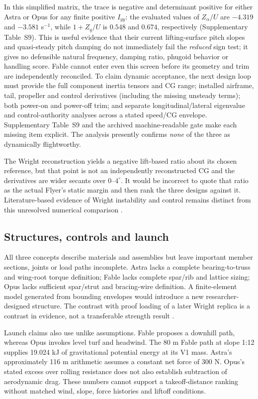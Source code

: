 \documentclass[10pt,letterpaper]{article}
\begin{document}
In this simplified matrix, the trace is negative and determinant positive for either Astra or Opus for any finite positive $I_{yy}$: the evaluated values of $Z_\alpha/U$ are $-4.319$ and $-3.581$ s$^{-1}$, while $1+Z_q/U$ is $0.548$ and $0.674$, respectively (Supplementary Table~S9). This is useful evidence that their current lifting-surface pitch slopes and quasi-steady pitch damping do not immediately fail the \emph{reduced} sign test; it gives no defensible natural frequency, damping ratio, phugoid behavior or handling score. Fable cannot enter even this screen before its geometry and trim are independently reconciled. To claim dynamic acceptance, the next design loop must provide the full component inertia tensors and CG range; installed airframe, tail, propeller and control derivatives (including the missing unsteady terms); both power-on and power-off trim; and separate longitudinal/lateral eigenvalue and control-authority analyses across a stated speed/CG envelope. Supplementary Table~S9 and the archived machine-readable gate make each missing item explicit. The analysis presently confirms \emph{none} of the three as dynamically flightworthy.



The Wright reconstruction yields a negative lift-based ratio about its chosen reference, but that point is not an independently reconstructed CG and the derivatives are wider secants over $0$--$4^\circ$. It would be incorrect to quote that ratio as the actual Flyer's static margin and then rank the three designs against it. Literature-based evidence of Wright instability and control remains distinct from this unresolved numerical comparison \cite{ref6,ref10}.

\subsection{Structures, controls and launch}
All three concepts describe materials and assemblies but leave important member sections, joints or load paths incomplete. Astra lacks a complete bearing-to-truss and wing-root torque definition; Fable lacks complete spar/rib and lattice sizing; Opus lacks sufficient spar/strut and bracing-wire definition. A finite-element model generated from bounding envelopes would introduce a new researcher-designed structure. The contrast with proof loading of a later Wright replica is a contrast in evidence, not a transferable strength result \cite{ref14}.

Launch claims also use unlike assumptions. Fable proposes a downhill path, whereas Opus invokes level turf and headwind. The 80 m Fable path at slope 1:12 supplies 19.024 kJ of gravitational potential energy at its V1 mass. Astra's approximately 116 m arithmetic assumes a constant net force of 300 N. Opus's stated excess over rolling resistance does not also establish subtraction of aerodynamic drag. These numbers cannot support a takeoff-distance ranking without matched wind, slope, force histories and liftoff conditions.
\end{document}
